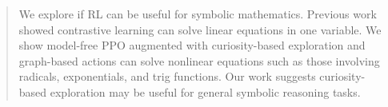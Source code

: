 \documentclass{article}
\theoremstyle{plain}
\theoremstyle{definition}
\theoremstyle{remark}
\begin{document}



\printAffiliationsAndNotice{\icmlEqualContribution} %

\begin{abstract}
We explore if RL can be useful for symbolic mathematics. Previous work showed contrastive learning can solve linear equations in one variable. We show model-free PPO \cite{schulman2017proximal} augmented with curiosity-based exploration and graph-based actions can solve nonlinear equations such as those involving radicals, exponentials, and trig functions. Our work suggests curiosity-based exploration may be useful for general symbolic reasoning tasks.
\end{abstract}
\end{document}

